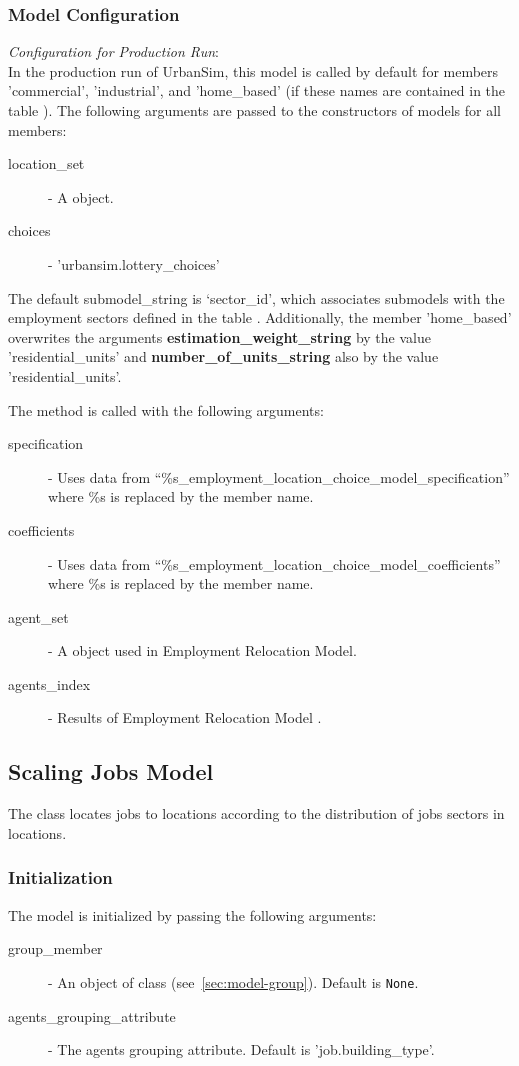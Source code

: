 \subsubsection{Model Configuration}
\modelsindex
%
{\em Configuration for Production Run}:\\[1mm]
In the production run of UrbanSim, this model is called by default for members 'commercial', 'industrial', and 'home_based'
 (if these names are contained in the table ). 
 The following arguments are passed to the constructors of models for all members:
\begin{description}
\item[location_set] - A  object.
\item[choices] - 'urbansim.lottery_choices'
\end{description}
The default submodel_string is `sector_id', which associates submodels with the employment sectors defined in the table .  Additionally, the member 'home_based' overwrites the arguments {\bf estimation_weight_string} by the value 'residential_units' 
and {\bf number_of_units_string} also by the value 'residential_units'.

The  method is called with the following arguments:
\begin{description}
\item[specification] - Uses data from
  ``\%s_employment_location_choice_model_specification'' where \%s is replaced by the member name.
\item[coefficients] \coefficientsindex - Uses data from ``\%s_employment_location_choice_model_coefficients'' 
    where \%s is replaced by the member name. \coefficientsindex\modelsindex
\item[agent_set] - A  object used in Employment Relocation Model. \modelsindex
\item[agents_index] - Results of Employment Relocation Model \modelsindex.
\end{description}
 
\subsection{Scaling Jobs Model}
\modelsindex
%
\label{sec:scaling-jobs-model} 
%
The class  \modelsindex locates jobs to locations according to the
distribution of jobs sectors in locations. 
\subsubsection{Initialization}
The model is initialized by passing the following arguments:
\begin{description}
\item[group_member] - An object of class  (see~\ref{sec:model-group}). Default is \verb|None|.
\item[agents_grouping_attribute] - The agents grouping attribute. Default is 'job.building_type'.
\end{description}

